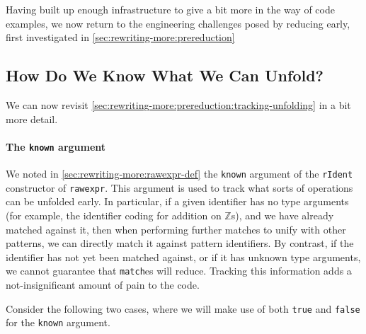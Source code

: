 Having built up enough infrastructure to give a bit more in the way of code examples, we now return to the engineering challenges posed by reducing early, first investigated in \autoref{sec:rewriting-more:prereduction}


\subsection{How Do We Know What We Can Unfold?}\label{sec:rewriting-more:prereduction-again:tracking-unfolding}
We can now revisit \autoref{sec:rewriting-more:prereduction:tracking-unfolding} in a bit more detail.

\paragraph{The \texttt{known} argument}\label{sec:rewriting-more:rIdent-known}
We noted in \autoref{sec:rewriting-more:rawexpr-def} the \texttt{known} argument of the \texttt{rIdent} constructor of \texttt{rawexpr}.
This argument is used to track what sorts of operations can be unfolded early.
In particular, if a given identifier has no type arguments (for example, the identifier coding for addition on $\mathbb{Z}$s), and we have already matched against it, then when performing further matches to unify with other patterns, we can directly match it against pattern identifiers.
By contrast, if the identifier has not yet been matched against, or if it has unknown type arguments, we cannot guarantee that \texttt{match}es will reduce.
Tracking this information adds a not-insignificant amount of pain to the code.

Consider the following two cases, where we will make use of both \texttt{true} and \texttt{false} for the \texttt{known} argument.

